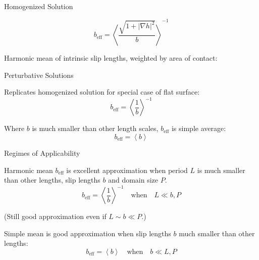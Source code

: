 \documentclass{beamer}
\newcommand{\beff}{\ensuremath{b_{\mathrm{eff}}}}
\begin{document}
\begin{frame}{Homogenized Solution}

\begin{equation}
\beff = \left< \frac{\sqrt{1 + \lvert \nabla h \rvert^2}}{b} \right> ^{-1}
\label{eq:homogharm}
\end{equation}

Harmonic mean of intrinsic slip lengths, weighted by area of contact:

\begin{center}
\end{center}

\end{frame}

\begin{frame}{Perturbative Solutions}

Replicates homogenized solution for special case of flat surface:
\begin{equation}
\beff = \left< \frac{1}{b} \right>^{-1}
\end{equation}

\vspace{1em}
Where $b$ is much smaller than other length scales, $\beff$ is simple average:
\begin{equation}
\beff = \left< b \right>
\end{equation}

\end{frame}

\begin{frame}{Regimes of Applicability}

Harmonic mean $\beff$ is excellent approximation when period $L$ is much smaller than other lengths, slip lengths $b$ and domain size $P$.
\begin{equation}
\beff = \left< \frac{1}{b} \right>^{-1}
\quad \text{when} \quad
L \ll b, P
\end{equation}

(Still good approximation even if $L \sim b \ll P$.)

\vspace{1em}
Simple mean is good approximation when slip lengths $b$ much smaller than other lengths:
\begin{equation}
\beff = \left< b \right>
\quad \text{when} \quad
b \ll L, P
\end{equation}

\end{frame}
\end{document}
